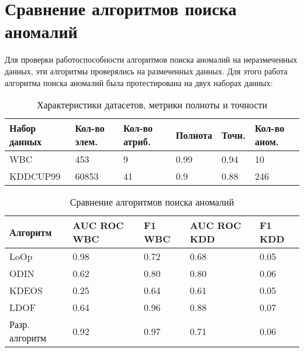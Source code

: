 \section{Сравнение  алгоритмов поиска аномалий}
Для проверки работоспособности алгоритмов поиска аномалий на неразмеченных данных, эти алгоритмы проверялись на размеченных данных.
Для этого работа алгоритма поиска аномалий была протестирована на двух наборах данных:
\begin{table}[!h]
	
	\caption{\label{tab:issled1}Характеристики датасетов, метрики полноты и точности}
	
	\begin{center}
		
		\begin{tabular}{|l|l|l|l|l|l|}
			
			\hline
			
			Набор данных& Кол-во элем. & Кол-во атриб. &  Полнота & Точн.& Кол-во аном.  \\
			
			\hline 
			
			WBC& 453 & 9 & 0.99&0.94 & 10  \\
			
			\hline
			KDDCUP99 & 60853 & 41 & 0.9&0.88 & 246  \\
			\hline
		
			
		\end{tabular}
		
	\end{center}
	
\end{table}
\begin{table}[h]
	
	\caption{\label{tab:issled2}Сравнение  алгоритмов поиска аномалий}
	
	\begin{center}
		
		\begin{tabular}{|l|l|l|l|l|}
			
			\hline
			
			Алгоритм & AUC ROC WBC & F1 WBC &  AUC ROC KDD & F1 KDD \\
			
			\hline 
			
			LoOp& 0.98 & 0.72 & 0.68& 0.05  \\
			
			\hline
			ODIN & 0.62 & 0.80 & 0.80& 0.06  \\
			
			\hline 
			KDEOS & 0.25	 & 0.64 & 0.61& 0.05  \\
			
			\hline 
			LDOF & 0.64	 & 0.96 & 0.88&0.07  \\
			
			\hline   
			Разр. алгоритм & 0.92	 & 0.97 & 0.71 & 0.06  \\
			
			\hline  
			
		\end{tabular}
		
	\end{center}
	
\end{table}
